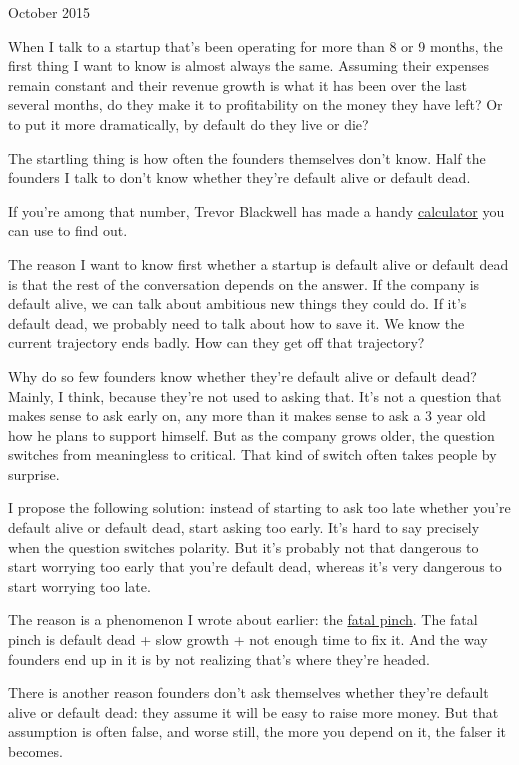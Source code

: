 October 2015

When I talk to a startup that's been operating for more than 8 or 9
months, the first thing I want to know is almost always the same.
Assuming their expenses remain constant and their revenue growth is what
it has been over the last several months, do they make it to
profitability on the money they have left? Or to put it more
dramatically, by default do they live or die?

The startling thing is how often the founders themselves don't know.
Half the founders I talk to don't know whether they're default alive or
default dead.

If you're among that number, Trevor Blackwell has made a handy
\href{http://growth.tlb.org/\#}{calculator} you can use to find out.

The reason I want to know first whether a startup is default alive or
default dead is that the rest of the conversation depends on the answer.
If the company is default alive, we can talk about ambitious new things
they could do. If it's default dead, we probably need to talk about how
to save it. We know the current trajectory ends badly. How can they get
off that trajectory?

Why do so few founders know whether they're default alive or default
dead? Mainly, I think, because they're not used to asking that. It's not
a question that makes sense to ask early on, any more than it makes
sense to ask a 3 year old how he plans to support himself. But as the
company grows older, the question switches from meaningless to critical.
That kind of switch often takes people by surprise.

I propose the following solution: instead of starting to ask too late
whether you're default alive or default dead, start asking too early.
It's hard to say precisely when the question switches polarity. But it's
probably not that dangerous to start worrying too early that you're
default dead, whereas it's very dangerous to start worrying too late.

The reason is a phenomenon I wrote about earlier: the
\href{pinch.html}{fatal pinch}. The fatal pinch is default dead + slow
growth + not enough time to fix it. And the way founders end up in it is
by not realizing that's where they're headed.

There is another reason founders don't ask themselves whether they're
default alive or default dead: they assume it will be easy to raise more
money. But that assumption is often false, and worse still, the more you
depend on it, the falser it becomes.

